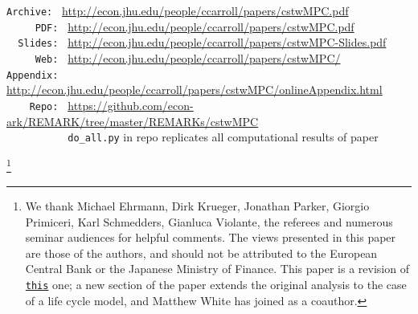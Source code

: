 \documentclass[12pt,titlepage]{econtex}
\begin{document}
\begin{small}
\parbox{\textwidth}{
  \begin{center}
\begin{tabbing}
\texttt{Archive:~} \= \= \url{http://econ.jhu.edu/people/ccarroll/papers/cstwMPC.pdf} \kill \\  %
\texttt{~~~~~PDF:~} \> \> \url{http://econ.jhu.edu/people/ccarroll/papers/cstwMPC.pdf} \\
\texttt{~~Slides:~} \> \> \url{http://econ.jhu.edu/people/ccarroll/papers/cstwMPC-Slides.pdf} \\
\texttt{~~~~~Web:~} \> \> \url{http://econ.jhu.edu/people/ccarroll/papers/cstwMPC/} \\
\texttt{Appendix:~} \> \> \url{http://econ.jhu.edu/people/ccarroll/papers/cstwMPC/onlineAppendix.html} \\
\texttt{~~~~Repo:~} \> \> \url{https://github.com/econ-ark/REMARK/tree/master/REMARKs/cstwMPC}\\
\texttt{~~~~~~~~~~} \> \>  \texttt{do\_all.py} in repo replicates all computational results of paper
\end{tabbing}
  \end{center}
}
\end{small}

\begin{authorsinfo}
\end{authorsinfo}



\thanks{We thank Michael Ehrmann, Dirk Krueger, Jonathan Parker, Giorgio Primiceri, Karl Schmedders, Gianluca Violante, the referees and numerous seminar audiences for helpful comments. The views presented in this paper are those of the authors, and should not be attributed to the European Central Bank or the Japanese Ministry of Finance.  This paper is a revision of \href{https://www.ecb.europa.eu/pub/pdf/scpwps/ecbwp1655.pdf}{\texttt{this}} one; a new section of the paper extends the original analysis to the case of a life cycle model, and Matthew White has joined as a coauthor.}
\end{document}
